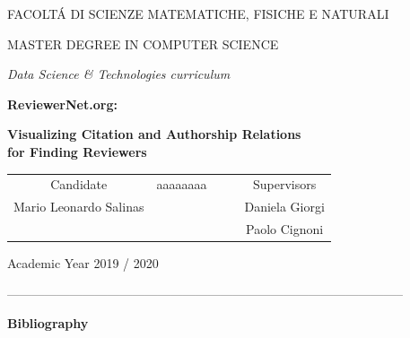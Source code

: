 \documentclass[11pt,a4paper,openany,oneside]{book}
\theoremstyle{definition}
\begin{document}
	\begin{Large}
		\begin{center}
			FACOLT\'A DI SCIENZE MATEMATICHE, FISICHE E NATURALI
			\vspace{1.5cm}


			MASTER DEGREE IN COMPUTER SCIENCE
			
			\textit{Data Science \& Technologies curriculum}
			\vspace{2.5cm}


			\textbf{ReviewerNet.org:}


			\textbf{Visualizing Citation and Authorship Relations\\for Finding Reviewers}
			\vspace{1.5cm}
			\begin{table}[h!]
				\centering
				\label{my-label}
				\begin{tabular}{ccccc}
					Candidate              & {\color{white} aaaaaaaa} &  &  & Supervisors                 					\\Mario Leonardo Salinas &                                             &  &  						& Daniela Giorgi \\
				   &                                             &  &  &  Paolo Cignoni \\
				                           

				\end{tabular}
			\end{table}
		\end{center}
	\end{Large}
	\vspace{0.5cm}
	\begin{normalsize}
		\begin{center}
			Academic Year 2019 / 2020
		\end{center}
	\end{normalsize}	
\newpage
	\cleardoublepage
	\tableofcontents
	\begin{normalsize}
-----------------------------------------------------------------------------------------------
	\end{normalsize}
	\textbf{Bibliography}
	
\end{document}
